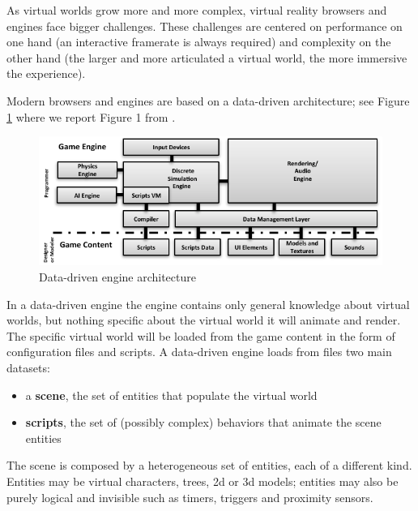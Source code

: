 
As virtual worlds grow more and more complex, virtual reality browsers and engines face bigger challenges. These challenges are centered on performance on one hand (an interactive framerate is always required) and complexity on the other hand (the larger and more articulated a virtual world, the more immersive the experience).

Modern browsers and engines are based on a data-driven architecture; see Figure \ref{fig:data_driven_games} where we report Figure 1 from \cite{SGL}.

\begin{figure}
\begin{center}
\includegraphics{engine_architecture.pdf}
\end{center}
\label{fig:data_driven_games}
\caption{Data-driven engine architecture}
\end{figure}

In a data-driven engine the engine contains only general knowledge about virtual worlds, but nothing specific about the virtual world it will animate and render. The specific virtual world will be loaded from the game content in the form of configuration files and scripts. A data-driven engine loads from files two main datasets:

\begin{itemize}
\item a \textbf{scene}, the set of entities that populate the virtual world
\item \textbf{scripts}, the set of (possibly complex) behaviors that animate the scene entities
\end{itemize}

The scene is composed by a heterogeneous set of entities, each of a different kind. Entities may be virtual characters, trees, 2d or 3d models; entities may also be purely logical and invisible such as timers, triggers and proximity sensors.

